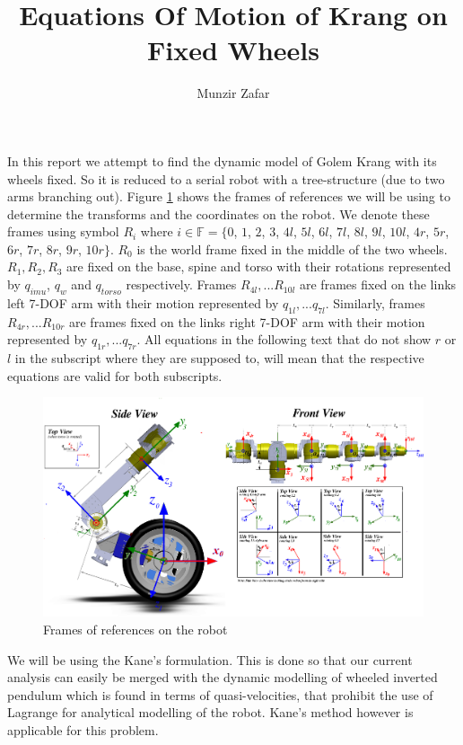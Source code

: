 \documentclass[a4paper,10pt]{article}
\title{Equations Of Motion of Krang on Fixed Wheels}
\author{Munzir Zafar}
\begin{document}
\maketitle

In this report we attempt to find the dynamic model of Golem Krang with its wheels fixed. So it
is reduced to a serial robot with a tree-structure (due to two arms branching out). Figure \ref{fig:frames}
shows the frames of references we will be using to determine the transforms and the coordinates on the robot.
We denote these frames using symbol $R_i$ where $i \in \mathbb{F} = \lbrace 0$, $1$, $2$, $3$, $4l$, $5l$, $6l$, $7l$,
$8l$, $9l$, $10l$, $4r$, $5r$, $6r$, $7r$, $8r$, $9r$, $10r \rbrace$. $R_0$ is the world frame fixed in the middle of
the two wheels. $R_1, R_2, R_3$ are fixed on the base, spine and torso with their rotations represented
by $q_{imu}$, $q_w$ and $q_{torso}$ respectively. Frames $R_{4l}, ... R_{10l}$ are frames fixed on the links left 7-DOF
arm with their motion represented by $q_{1l}, ... q_{7l}$. Similarly, frames $R_{4r}, ... R_{10r}$ are frames 
fixed on the links right 7-DOF arm with their motion represented by $q_{1r}, ... q_{7r}$. All equations in the 
following text that do not show $r$ or $l$ in the subscript where they are supposed to, will mean that the 
respective equations are valid for both subscripts.

\begin{figure}
 \centering
 \includegraphics[width=1.0\textwidth]{Figures/framesLHRule.png}
 \caption{Frames of references on the robot}
 \label{fig:frames}
\end{figure}

We will be using the Kane's formulation. This is done so that our current analysis can easily be merged with
the dynamic modelling of wheeled inverted pendulum which is found in terms of quasi-velocities, that prohibit
the use of Lagrange for analytical modelling of the robot. Kane's method however is applicable for this
problem.
\end{document}
